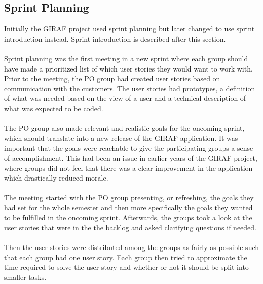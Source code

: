 \subsection{Sprint Planning} \label{subsec:sprint-planning}
Initially the GIRAF project used sprint planning but later changed to use sprint introduction instead.
Sprint introduction is described after this section.
\\
\\
Sprint planning was the first meeting in a new sprint where each group should have made a prioritized list of which user stories they would want to work with.
Prior to the meeting, the PO group had created user stories based on communication with the customers.
The user stories had prototypes, a definition of what was needed based on the view of a user and a technical description of what was expected to be coded.
\\
\\
The PO group also made relevant and realistic goals for the oncoming sprint, which should translate into a new release of the GIRAF application.
It was important that the goals were reachable to give the participating groups a sense of accomplishment.
This had been an issue in earlier years of the GIRAF project, where groups did not feel that there was a clear improvement in the application which drastically reduced morale.
\\
\\
The meeting started with the PO group presenting, or refreshing, the goals they had set for the whole semester and then more specifically the goals they wanted to be fulfilled in the oncoming sprint.
Afterwards, the groups took a look at the user stories that were in the the backlog and asked clarifying questions if needed.
\\
\\
Then the user stories were distributed among the groups as fairly as possible such that each group had one user story.
Each group then tried to approximate the time required to solve the user story and whether or not it should be split into smaller tasks.


